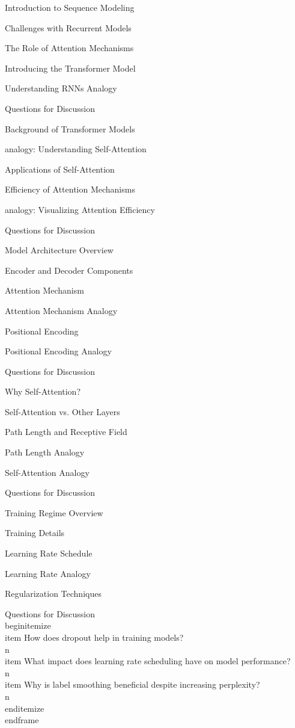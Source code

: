 \documentclass{beamer}
\begin{document}
\begin{frame}[]{Introduction to Sequence Modeling}
\begin{frame}[]{Challenges with Recurrent Models}
\begin{frame}[]{The Role of Attention Mechanisms}
\begin{frame}[]{Introducing the Transformer Model}
\begin{frame}[plain]{Understanding RNNs Analogy}
\begin{frame}[]{Questions for Discussion}
\begin{frame}[]{Background of Transformer Models}
\begin{frame}[plain]{analogy: Understanding Self-Attention}
\begin{frame}[]{Applications of Self-Attention}
\begin{frame}[]{Efficiency of Attention Mechanisms}
\begin{frame}[plain]{analogy: Visualizing Attention Efficiency}
\begin{frame}[]{Questions for Discussion}
\begin{frame}[]{Model Architecture Overview}
\begin{frame}[]{Encoder and Decoder Components}
\begin{frame}[]{Attention Mechanism}
\begin{frame}[plain]{Attention Mechanism Analogy}
\begin{frame}[]{Positional Encoding}
\begin{frame}[plain]{Positional Encoding Analogy}
\begin{frame}[]{Questions for Discussion}
\begin{frame}[]{Why Self-Attention?}
\begin{frame}[]{Self-Attention vs. Other Layers}
\begin{frame}[]{Path Length and Receptive Field}
\begin{frame}[plain]{Path Length Analogy}
\begin{frame}[plain]{Self-Attention Analogy}
\begin{frame}[]{Questions for Discussion}
\begin{frame}[]{Training Regime Overview}
\begin{frame}[]{Training Details}
\begin{frame}[]{Learning Rate Schedule}
\begin{frame}[plain]{Learning Rate Analogy}
\begin{frame}[]{Regularization Techniques}
\begingroup
{}\n{}\n\begin{frame}[]{Questions for Discussion}\n\\begin{itemize}
\\item How does dropout help in training models?\\n\\item What impact does learning rate scheduling have on model performance?\\n\\item Why is label smoothing beneficial despite increasing perplexity?\\n\\end{itemize}
\\end{frame}

\endgroup


\end{frame}
\end{frame}
\end{frame}
\end{frame}
\end{frame}
\end{frame}
\end{frame}
\end{frame}
\end{frame}
\end{frame}
\end{frame}
\end{frame}
\end{frame}
\end{frame}
\end{frame}
\end{frame}
\end{frame}
\end{frame}
\end{frame}
\end{frame}
\end{frame}
\end{frame}
\end{frame}
\end{frame}
\end{frame}
\end{frame}
\end{frame}
\end{frame}
\end{frame}
\end{frame}
\end{frame}
\end{document}
